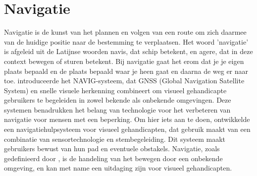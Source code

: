 \section{Navigatie}
\label{sec:navigatie}
Navigatie is de kunst van het plannen en volgen van een route om zich daarmee van de huidige positie naar de bestemming te verplaatsen. Het woord 'navigatie' is afgeleid uit de Latijnse woorden navis, dat schip betekent, en agere, dat in deze context bewegen of sturen betekent. Bij navigatie gaat het erom dat je je eigen plaats bepaald en de plaats bepaald waar je heen gaat en daarna de weg er naar toe. \textcite{Katz2010} introduceerde het NAVIG-systeem, dat GNSS (Global Navigation Satellite System) en snelle visuele herkenning combineert om visueel gehandicapte gebruikers te begeleiden in zowel bekende als onbekende omgevingen. Deze systemen benadrukken het belang van technologie voor het verbeteren van navigatie voor mensen met een beperking. Om hier iets aan te doen, ontwikkelde \textcite{Lakde2015} een navigatiehulpsysteem voor visueel gehandicapten, dat gebruik maakt van een combinatie van sensortechnologie en stembegeleiding. Dit systeem maakt gebruikers bewust van hun pad en eventuele obstakels. Navigatie, zoals gedefinieerd door \textcite{Gachet2010}, is de handeling van het bewegen door een onbekende omgeving, en kan met name een uitdaging zijn voor visueel gehandicapten.
